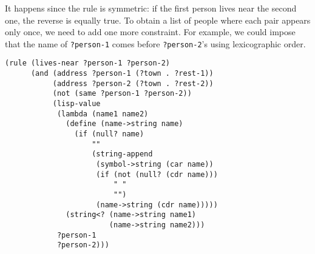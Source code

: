 \documentclass[a4paper,12pt]{article}
\begin{document}
It happens since the rule is symmetric: if the first person lives near
the second one, the reverse is equally true.  To obtain a list of
people where each pair appears only once, we need to add one more
constraint.  For example, we could impose that the name of
\lstinline!?person-1! comes before \lstinline!?person-2!'s using
lexicographic order.

\begin{lstlisting}
(rule (lives-near ?person-1 ?person-2)
      (and (address ?person-1 (?town . ?rest-1))
           (address ?person-2 (?town . ?rest-2))
           (not (same ?person-1 ?person-2))
           (lisp-value
            (lambda (name1 name2)
              (define (name->string name)
                (if (null? name)
                    ""
                    (string-append
                     (symbol->string (car name))
                     (if (not (null? (cdr name)))
                         " "
                         "")
                     (name->string (cdr name)))))
              (string<? (name->string name1)
                        (name->string name2)))
            ?person-1
            ?person-2)))
\end{lstlisting}
\end{document}

